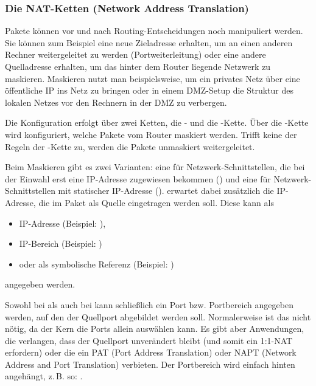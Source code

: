 \subsubsection{Die NAT-Ketten (Network Address Translation)}

Pakete können vor und nach Routing-Entscheidungen noch manipuliert
werden. Sie können zum Beispiel eine neue Zieladresse erhalten, um an einen
anderen Rechner weitergeleitet zu werden (Portweiterleitung) oder eine
andere Quelladresse erhalten, um das hinter dem Router liegende
Netzwerk zu maskieren. Maskieren nutzt man beispielsweise, um ein privates Netz
über eine öffentliche IP ins Netz zu bringen oder in einem DMZ-Setup
die Struktur des lokalen Netzes vor den Rechnern in der DMZ zu
verbergen.

Die Konfiguration erfolgt über zwei Ketten, die - und die
-Kette. Über die -Kette wird
konfiguriert, welche Pakete vom Router maskiert werden. Trifft keine der Regeln
der -Kette zu, werden die Pakete unmaskiert
weitergeleitet. 

Beim Maskieren gibt es zwei Varianten: eine für Netzwerk-Schnittstellen, die
bei der Einwahl erst eine IP-Adresse zugewiesen bekommen
() und eine für Netzwerk-Schnittstellen mit statischer
IP-Adresse ().  erwartet dabei zusätzlich die
IP-Adresse, die im Paket als Quelle eingetragen werden soll. Diese kann als
\begin{itemize}
\item IP-Adresse (Beispiel: ),
\item IP-Bereich (Beispiel: )
\item oder als symbolische Referenz (Beispiel:
)
\end{itemize}
angegeben werden.

Sowohl bei  als auch bei  kann schließlich
ein Port bzw. Portbereich angegeben werden, auf den der
Quellport abgebildet werden soll. Normalerweise ist das nicht nötig,
da der Kern die Ports allein auswählen kann. Es gibt aber
Anwendungen, die verlangen, dass der Quellport unverändert bleibt
(und somit ein 1:1-NAT erfordern) oder die ein PAT (Port Address Translation)
oder NAPT (Network Address and Port Translation) verbieten. Der Portbereich wird
einfach hinten angehängt, z.\,B. so:
.

